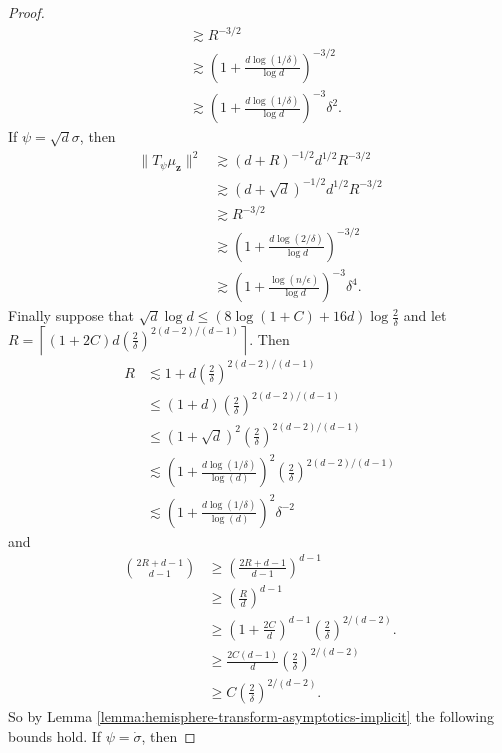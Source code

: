 \documentclass{article}
\theoremstyle{definition}
\def\vz{{\bm{z}}}
\begin{document}
\begin{proof}
\begin{align*}
        &\gtrsim R^{-3/2}\\
        &\gtrsim \left(1  +\frac{d \log(1/\delta) }{\log d}\right)^{-3/2}\\
        &\gtrsim \left(1 + \frac{d \log(1/\delta)}{\log d}\right)^{-3} \delta^2.
    \end{align*}
    If $\psi = \sqrt{d}\sigma$, then
    \begin{align*}
        \|T_{\psi}\mu_{\vz}\|^2 &\gtrsim (d + R)^{-1/2}d^{1/2}R^{-3/2}\\
        &\gtrsim (d + \sqrt{d})^{-1/2}d^{1/2}R^{-3/2}\\
        &\gtrsim R^{-3/2}\\
        &\gtrsim \left(1 + \frac{ d\log(2/\delta)}{\log d}\right)^{-3/2}\\
        &\gtrsim \left(1 + \frac{\log(n/\epsilon)}{\log d}\right)^{-3} \delta^4.
    \end{align*}
    Finally suppose that $\sqrt{d} \log d \leq (8 \log(1 + C) + 16 d) \log \frac{2}{\delta}$ and let $R = \left\lceil (1 + 2C)d\left(\frac{2}{\delta}\right)^{2(d - 2)/(d - 1)}\right\rceil $. Then
    \begin{align*}
        R &\lesssim  1 + d\left(\frac{2}{\delta}\right)^{2(d - 2)/(d -1) }\\
        &\leq (1 + d)\left(\frac{2}{\delta}\right)^{2(d - 2)/(d - 1) }\\
        &\leq \left(1 + \sqrt{d}\right)^2 \left(\frac{2}{\delta}\right)^{2(d - 2)/(d - 1)}\\
        &\lesssim \left(1 + \frac{d \log(1/\delta)}{\log(d)}\right)^2\left(\frac{2}{\delta}\right)^{2(d - 2)/(d - 1)}\\
        &\lesssim \left(1 + \frac{d \log(1/\delta)}{\log(d)}\right)^2 \delta^{-2}
    \end{align*}
    and
    \begin{align*}
        \binom{2R + d - 1}{d - 1} &\geq \left(\frac{2R + d - 1}{d - 1}\right)^{d -1 }\\
        &\geq \left(\frac{R}{d}\right)^{d -1 }\\
        &\geq \left(1 + \frac{2C}{d}\right)^{d - 1}\left(\frac{2}{\delta}\right)^{2/(d - 2)}.\\
        &\geq \frac{2C(d - 1)}{d}\left(\frac{2}{\delta}\right)^{2/(d - 2)}\\
        &\geq C\left(\frac{2}{\delta}\right)^{2/(d - 2)}.
    \end{align*}
    So by Lemma \ref{lemma:hemisphere-transform-asymptotics-implicit} the following bounds hold. If $\psi = \dot{\sigma}$, then

\end{proof}
\end{document}
